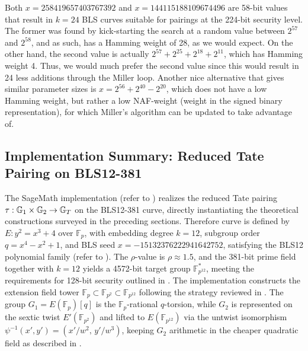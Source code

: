 \begin{example}
	Both $x = 258419657403767392$ and $x = 144115188109674496$ are 58-bit values that result in $k = 24$ BLS curves suitable for pairings at the 224-bit security level. The former was found by kick-starting the search at a random value between $2^{57}$ and $2^{58}$, and as such, has a Hamming weight of 28, as we would expect. On the other hand, the second value is actually $2^{57} + 2^{25} + 2^{18} + 2^{11}$, which has Hamming weight 4. Thus, we would much prefer the second value since this would result in 24 less additions through the Miller loop. Another nice alternative that gives similar parameter sizes is $x = 2^{56} + 2^{40} - 2^{20}$, which does not have a low Hamming weight, but rather a low NAF-weight (weight in the signed binary representation), for which Miller's algorithm can be updated to take advantage of.
	
	\label{example:blshamming}
\end{example}





\subsection{Implementation Summary: Reduced Tate Pairing on BLS12-381}
\label{ssec:tateimplemented}

The SageMath implementation (refer to ) realizes the reduced Tate pairing
$\tau: \mathbb{G}_1 \times \mathbb{G}_2 \to \mathbb{G}_T$ on the BLS12-381 curve, directly instantiating the theoretical constructions surveyed in the preceding sections. Therefore curve is defined by $E: y^2 = x^3 + 4$ over $\mathbb{F}_p$, with embedding degree $k = 12$, subgroup order $q = x^4 - x^2 + 1$,
and BLS seed $x = -15132376222941642752$, satisfying the BLS12  polynomial family (refer to ). The $\rho$-value is $\rho \approx 1.5$, and the 381-bit prime field together with $k = 12$ yields a 4572-bit target group
$\mathbb{F}_{p^{12}}^*$, meeting the requirements for 128-bit security outlined in .  The implementation constructs the extension field tower $\mathbb{F}_p \subset \mathbb{F}_{p^2} \subset \mathbb{F}_{p^{12}}$ following the strategy reviewed in . The group $G_1 = E(\mathbb{F}_p)[q]$ is the $\mathbb{F}_p$-rational $q$-torsion, while $G_2$ is represented on the sextic twist $E'(\mathbb{F}_{p^2})$ and lifted to $E(\mathbb{F}_{p^{12}})$ via the untwist isomorphism $\psi^{-1}(x', y') = (x'/w^2,\, y'/w^3)$, keeping $G_2$ arithmetic in the cheaper quadratic field as described in .

